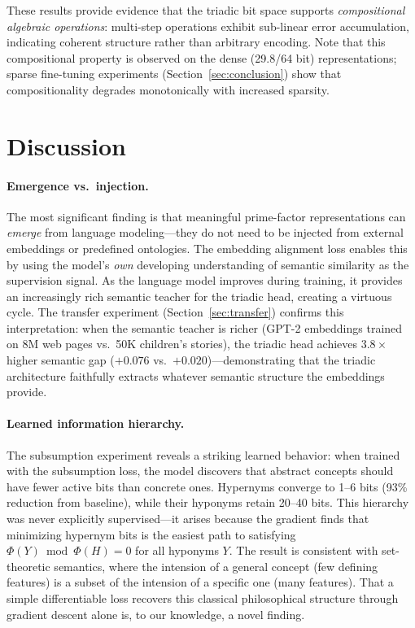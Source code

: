 \documentclass[11pt,a4paper]{article}
\begin{document}
These results provide evidence that the triadic bit space supports \emph{compositional algebraic operations}: multi-step operations exhibit sub-linear error accumulation, indicating coherent structure rather than arbitrary encoding. Note that this compositional property is observed on the dense (29.8/64 bit) representations; sparse fine-tuning experiments (Section~\ref{sec:conclusion}) show that compositionality degrades monotonically with increased sparsity.


\section{Discussion}
\label{sec:discussion}

\paragraph{Emergence vs.\ injection.}
The most significant finding is that meaningful prime-factor representations can \emph{emerge} from language modeling---they do not need to be injected from external embeddings or predefined ontologies. The embedding alignment loss enables this by using the model's \emph{own} developing understanding of semantic similarity as the supervision signal. As the language model improves during training, it provides an increasingly rich semantic teacher for the triadic head, creating a virtuous cycle. The transfer experiment (Section~\ref{sec:transfer}) confirms this interpretation: when the semantic teacher is richer (GPT-2 embeddings trained on 8M web pages vs.\ 50K children's stories), the triadic head achieves $3.8\times$ higher semantic gap ($+0.076$ vs.\ $+0.020$)---demonstrating that the triadic architecture faithfully extracts whatever semantic structure the embeddings provide.

\paragraph{Learned information hierarchy.}
The subsumption experiment reveals a striking learned behavior: when trained with the subsumption loss, the model discovers that abstract concepts should have fewer active bits than concrete ones. Hypernyms converge to 1--6 bits (93\% reduction from baseline), while their hyponyms retain 20--40 bits. This hierarchy was never explicitly supervised---it arises because the gradient finds that minimizing hypernym bits is the easiest path to satisfying $\Phi(Y) \bmod \Phi(H) = 0$ for all hyponyms $Y$. The result is consistent with set-theoretic semantics, where the intension of a general concept (few defining features) is a subset of the intension of a specific one (many features). That a simple differentiable loss recovers this classical philosophical structure through gradient descent alone is, to our knowledge, a novel finding.
\end{document}
